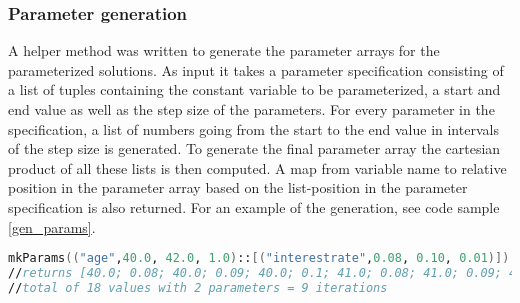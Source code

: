 \begin{table}[h!]
\centering
{}
\caption{Parameterized CalcSpec calculations per ms with double precision\label{table:cubaseGeneratedParamdoubletime}}
\end{table}
\subsubsection{Parameter generation}\label{subsubsec:paramgen}
A helper method was written to generate the parameter arrays for the parameterized solutions.
As input it takes a parameter specification consisting of a list of tuples containing the constant variable to be parameterized, a start and end value as well as the step size of the parameters.
For every parameter in the specification, a list of numbers going from the start to the end value in intervals of the step size is generated.
To generate the final parameter array the cartesian product of all these lists is then computed.
A map from variable name to relative position in the parameter array based on the list-position in the parameter specification is also returned.
For an example of the generation, see code sample \ref{gen_params}.

\begin{lstlisting}[language=fsharp, caption=Parameter generation with the age variable ranging from 40 to 42 and the interest rate variable ranging from 8\% to 10\%, label=gen_params]
mkParams(("age",40.0, 42.0, 1.0)::[("interestrate",0.08, 0.10, 0.01)])
//returns [40.0; 0.08; 40.0; 0.09; 40.0; 0.1; 41.0; 0.08; 41.0; 0.09; 41.0; 0.1; 42.0; 0.08; 42.0; 0.09; 42.0; 0.1]
//total of 18 values with 2 parameters = 9 iterations
\end{lstlisting}

